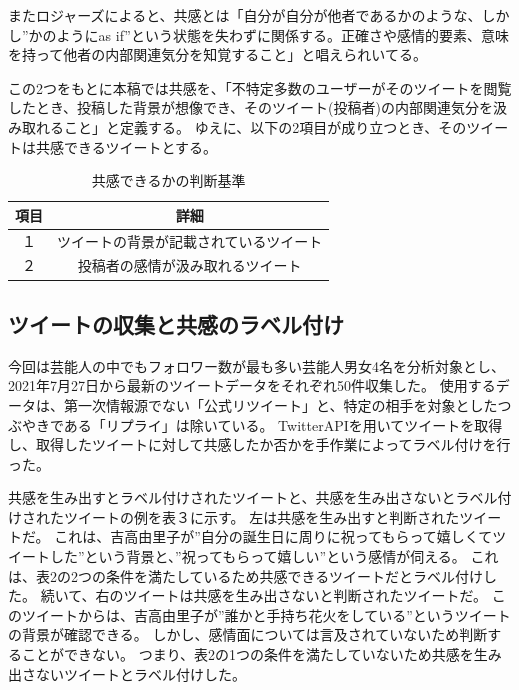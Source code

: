 \documentclass[dvipdfmx]{issj}
\begin{document}
またロジャーズによると、共感とは「自分が自分が他者であるかのような、しかし”かのようにas if”という状態を失わずに関係する。正確さや感情的要素、意味を持って他者の内部関連気分を知覚すること」と唱えられいてる。


この2つをもとに本稿では共感を、「不特定多数のユーザーがそのツイートを閲覧したとき、投稿した背景が想像でき、そのツイート(投稿者)の内部関連気分を汲み取れること」と定義する。
ゆえに、以下の2項目が成り立つとき、そのツイートは共感できるツイートとする。

\begin{table}[h]\centering
\caption{共感できるかの判断基準}\label{tbl:font}
\begin{small}
\begin{tabular}{|c|c|} \hline
項目   & 詳細\\\hline\hline
１& ツイートの背景が記載されているツイート\\\hline
２ & 投稿者の感情が汲み取れるツイート\\\hline
\end{tabular}
\end{small}
\end{table}


\subsection{ツイートの収集と共感のラベル付け }  %
今回は芸能人の中でもフォロワー数が最も多い芸能人男女4名を分析対象とし、2021年7月27日から最新のツイートデータをそれぞれ50件収集した。
使用するデータは、第一次情報源でない「公式リツイート」と、特定の相手を対象としたつぶやきである「リプライ」は除いている。
TwitterAPIを用いてツイートを取得し、取得したツイートに対して共感したか否かを手作業によってラベル付けを行った。


共感を生み出すとラベル付けされたツイートと、共感を生み出さないとラベル付けされたツイートの例を表３に示す。
左は共感を生み出すと判断されたツイートだ。
これは、吉高由里子が”自分の誕生日に周りに祝ってもらって嬉しくてツイートした”という背景と、”祝ってもらって嬉しい”という感情が伺える。
これは、表2の2つの条件を満たしているため共感できるツイートだとラベル付けした。
続いて、右のツイートは共感を生み出さないと判断されたツイートだ。
このツイートからは、吉高由里子が”誰かと手持ち花火をしている”というツイートの背景が確認できる。
しかし、感情面については言及されていないため判断することができない。
つまり、表2の1つの条件を満たしていないため共感を生み出さないツイートとラベル付けした。
\end{document}
